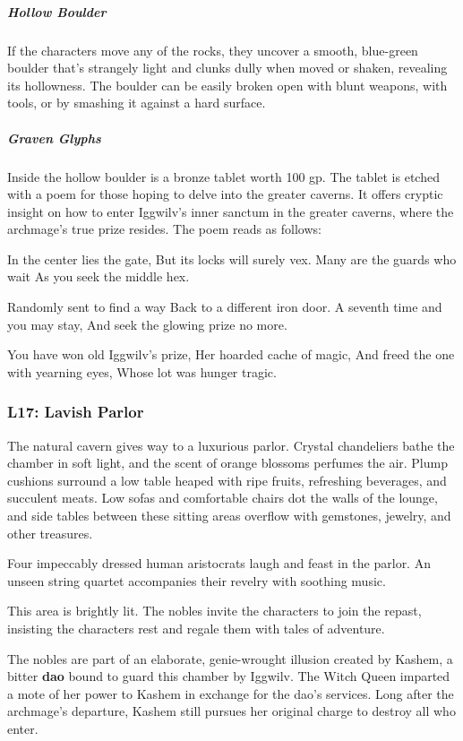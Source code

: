 \documentclass[10pt,a4paper,twoside,bg=print,twocolumn,openany,nodeprecatedcode]{dndbook}
\begin{document}
\subparagraph{Hollow Boulder}
If the characters move any of the rocks, they uncover a smooth, blue-green boulder that's strangely light and clunks dully when moved or shaken, revealing its hollowness. The boulder can be easily broken open with blunt weapons, with tools, or by smashing it against a hard surface.

\subparagraph{Graven Glyphs}
Inside the hollow boulder is a bronze tablet worth 100 gp. The tablet is etched with a poem for those hoping to delve into the greater caverns. It offers cryptic insight on how to enter Iggwilv's inner sanctum in the greater caverns, where the archmage's true prize resides. The poem reads as follows:

\begin{DndReadAloud}{}
In the center lies the gate, But its locks will surely vex. Many are the guards who wait As you seek the middle hex.

Randomly sent to find a way Back to a different iron door. A seventh time and you may stay, And seek the glowing prize no more.

You have won old Iggwilv's prize, Her hoarded cache of magic, And freed the one with yearning eyes, Whose lot was hunger tragic.

\end{DndReadAloud}

\subsubsection{L17: Lavish Parlor}
\begin{DndReadAloud}{}
The natural cavern gives way to a luxurious parlor. Crystal chandeliers bathe the chamber in soft light, and the scent of orange blossoms perfumes the air. Plump cushions surround a low table heaped with ripe fruits, refreshing beverages, and succulent meats. Low sofas and comfortable chairs dot the walls of the lounge, and side tables between these sitting areas overflow with gemstones, jewelry, and other treasures.

Four impeccably dressed human aristocrats laugh and feast in the parlor. An unseen string quartet accompanies their revelry with soothing music.

\end{DndReadAloud}

This area is brightly lit. The nobles invite the characters to join the repast, insisting the characters rest and regale them with tales of adventure.

The nobles are part of an elaborate, genie-wrought illusion created by Kashem, a bitter \textbf{dao} bound to guard this chamber by Iggwilv. The Witch Queen imparted a mote of her power to Kashem in exchange for the dao's services. Long after the archmage's departure, Kashem still pursues her original charge to destroy all who enter.
\end{document}
